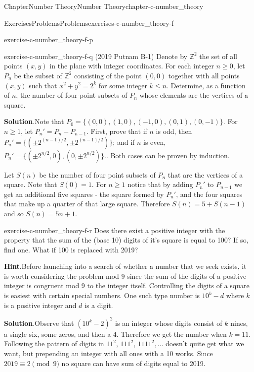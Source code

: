 \documentclass[oneside,10pt,]{book}
\newcommand{\blocktitlefont}{\relax}
\numberwithin{equation}{section}
\begin{document}
\begin{chapterptx}{Chapter}{Number Theory}{}{Number Theory}{}{}{chapter-c-number_theory}
\begin{exercises-section}{Exercises}{Problems}{}{Problems}{}{}{exercises-c-number_theory-f}
\begin{divisionexercise}{14}{}{}{exercise-c-number_theory-f-p}
\end{divisionexercise}%
\begin{divisionexercise}{15}{}{}{exercise-c-number_theory-f-q}%
(2019 Putnam B-1) Denote by \(\mathbb{Z}^2\) the set of all points \((x,y)\) in the plane with integer coordinates. For each integer \(n \geq 0\), let \(P_n\) be the subset of \(\mathbb{Z}^2\) consisting of the point \((0,0)\) together with all points \((x,y)\) such that \(x^2 + y^2 = 2^k\) for some integer \(k \leq n\). Determine, as a function of \(n\), the number of four-point subsets of \(P_n\) whose elements are the vertices of a square.%
\par\smallskip%
\noindent\textbf{\blocktitlefont Solution}.\hypertarget{solution-c-number_theory-f-q-b}{}\quad{}Note that \(P_0 = \{ (0,0), (1,0), (-1,0), (0,1), (0,-1)\}\).  For \(n \geq 1\), let  \(P_n' =P_n - P_{n-1}\).  First, prove that if \(n\) is odd, then \(P_n' = \{(\pm 2^{(n-1)/2},\pm 2^{(n-1)/2})\}\); and if \(n\) is even, \(P_n' = \{(\pm 2^{n/2},0),(0,\pm 2^{n/2})\}\)..  Both cases can be proven by induction.%
\par
Let \(S(n)\) be the number of four point subsets of \(P_n\) that are the vertices of a square.  Note that \(S(0)=1\).  For \(n \geq 1\) notice that by adding \(P_{n}'\) to \(P_{n-1}\) we get an additional five squares - the square formed by \(P_{n}'\), and the four squares that make up a quarter of that large square. Therefore \(S(n) = 5 + S(n-1)\) and so \(S(n)=5n + 1\).%
\end{divisionexercise}%
\begin{divisionexercise}{16}{}{}{exercise-c-number_theory-f-r}%
Does there exist a positive integer with the property that the sum of the (base 10) digits of it’s square is equal to 100?  If so, find one. What if 100 is replaced with 2019?%
\par\smallskip%
\noindent\textbf{\blocktitlefont Hint}.\hypertarget{hint-c-number_theory-f-r-b}{}\quad{}Before launching into a search of whether a number that we seek exists, it is worth considering the problem mod 9 since the sum of the digits of a positive integer is congruent mod 9 to the integer itself.   Controlling the digits of a square is easiest with certain special numbers.   One such type number is \(10^k-d\) where \(k\) is a positive integer and \(d\) is a digit.%
\par\smallskip%
\noindent\textbf{\blocktitlefont Solution}.\hypertarget{solution-c-number_theory-f-r-c}{}\quad{}Observe that \((10^k - 2)^2\) is an integer whose digits consist of \(k\) nines, a single six, some zeros, and then a 4.   Therefore we get the number when \(k=11\).  Following the pattern of digits in \(11^2\), \(111^2\), \(1111^2, \dots\) doesn't quite get what we want, but prepending an integer with all ones with a 10 works.   Since \(2019 \equiv 2 \pmod{9}\) no square can have sum of digits equal to 2019.%
\end{divisionexercise}%
\end{exercises-section}
\end{chapterptx}
\end{document}
